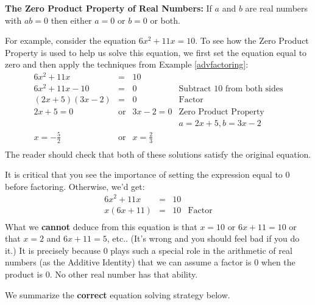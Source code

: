 \documentclass[11pt]{article}
\theoremstyle{definition}  %
\newcommand{\bbm}{\begin{boxedminipage}{6.41in}}
\newcommand{\ebm}{\end{boxedminipage}}
\begin{document}
\medskip
 
\colorbox{ResultColor}{\bbm

\textbf{The Zero Product Property of Real Numbers:}  If $a$ and $b$ are real numbers with $ab = 0$ then either $a = 0$ or $b = 0$ or both.

\ebm}

\medskip

For example, consider the equation $6x^2 + 11x = 10$.  To see how the Zero Product Property is used to help us solve this equation, we first set the equation equal to zero and then apply the techniques from Example \ref{advfactoring}: \[ \begin{array}{rclr}
6x^2 + 11x & = & 10 \\
6x^2 + 11x - 10 & = & 0 & \text{Subtract $10$ from both sides} \\
(2x+5)(3x-2) & = & 0 & \text{Factor} \\
2x +5 = 0 & \text{or} & 3x -2 = 0 & \text{Zero Product Property} \\ [-2pt]
          &           &           & a = 2x+5, b = 3x-2 \\ [-8pt]
x = -\frac{5}{2} & \text{or} & x = \frac{2}{3} & \\ \end{array} \] The reader should check that both of these solutions satisfy the original equation.

\smallskip

It is critical that you see the importance of setting the expression equal to $0$ before factoring. Otherwise, we'd get: \[ \begin{array}{rclr}

6x^2 + 11x & = & 10 \\
x(6x + 11) & = & 10 & \text{Factor} \\
\end{array} \] What we \textbf{cannot} deduce from this equation is that $x = 10$ or $6x+11 = 10$ or that $x = 2$ and $6x+11 = 5$, etc..  (It's wrong and you should feel bad if you do it.)  It is precisely because $0$ plays such a special role in the arithmetic of real numbers (as the Additive Identity) that we can assume a factor is $0$ when the product is $0$.  No other real number has that ability.

\smallskip

We summarize the {\bf correct} equation solving strategy below.

\medskip

\label{solvenonlineareqns}
\end{document}
